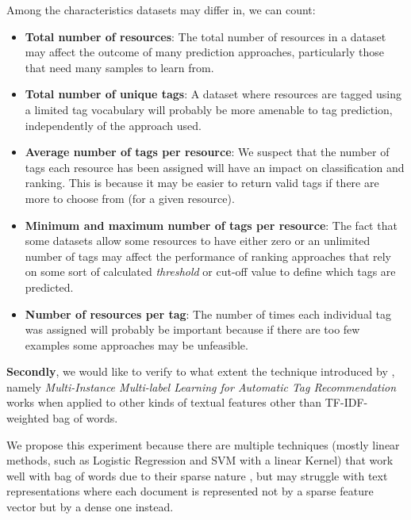 Among the characteristics datasets may differ in, we can count:

\begin{itemize}
    \item \textbf{Total number of resources}: The total number of resources in a dataset may affect the outcome of many prediction approaches, particularly those that need many samples to learn from.
    
    \item \textbf{Total number of unique tags}: A dataset where resources are tagged using a limited tag vocabulary will probably be more amenable to tag prediction, independently of the approach used.
    
    \item \textbf{Average number of tags per resource}: We suspect that the number of tags each resource has been assigned will have an impact on classification and ranking. This is because it may be easier to return valid tags if there are more to choose from (for a given resource).
    
    \item \textbf{Minimum and maximum number of tags per resource}: The fact that some datasets allow some resources to have either zero or an unlimited number of tags may affect the performance of ranking approaches that rely on some sort of calculated \textit{threshold} or cut-off value to define which tags are predicted.
    
    \item \textbf{Number of resources per tag}: The number of times each individual tag was assigned will probably be important because if there are too few examples some approaches may be unfeasible.

\end{itemize}

\textbf{Secondly}, we would like to verify to what extent the technique introduced by \cite{shen_etal_2009}, namely \textit{Multi-Instance Multi-label Learning for Automatic Tag Recommendation} works when applied to other kinds of textual features other than TF-IDF-weighted bag of words.

We propose this experiment because there are multiple techniques (mostly linear methods, such as Logistic Regression and SVM with a linear Kernel) that work well with bag of words due to their sparse nature \citep{hsu_etal_2010, li_etal_2015}, but may struggle with text representations where each document is represented not by a sparse feature vector but by a dense one instead.

